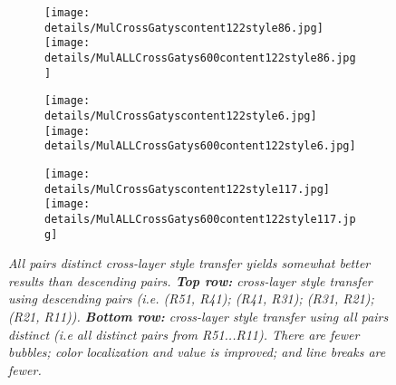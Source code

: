 \documentclass[runningheads]{llncs}
\begin{document}




\begin{figure}[!htbp]
\centering
\small 
\begin{subfigure}[t]{0.3\linewidth}
    \texttt{[image: details/MulCrossGatyscontent122style86.jpg]}
    \texttt{[image: details/MulALLCrossGatys600content122style86.jpg]}
\end{subfigure}
\begin{subfigure}[t]{0.3\linewidth}
    \texttt{[image: details/MulCrossGatyscontent122style6.jpg]}
    \texttt{[image: details/MulALLCrossGatys600content122style6.jpg]}
\end{subfigure}
\begin{subfigure}[t]{0.3\linewidth}
    \texttt{[image: details/MulCrossGatyscontent122style117.jpg]}
    \texttt{[image: details/MulALLCrossGatys600content122style117.jpg]}
\end{subfigure}
\caption{\em All pairs distinct cross-layer style transfer yields somewhat better results than descending pairs.  {\bf
    Top row:} cross-layer style transfer using descending pairs (i.e. (R51, R41); (R41, R31); (R31, R21); (R21, R11)).
  {\bf Bottom row:}  cross-layer style transfer using all pairs distinct (i.e  all distinct pairs from R51...R11).
There are fewer bubbles; color localization and value is improved; and line breaks are fewer.
  \label{fig:CGALL}}
\end{figure}
\end{document}
